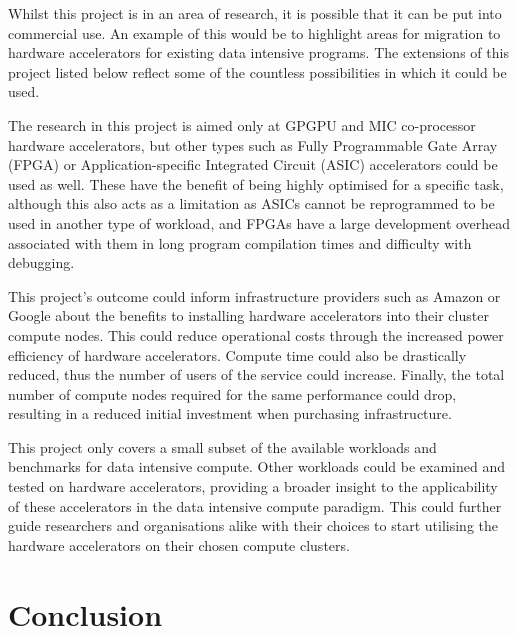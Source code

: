\documentclass[12pt,a4paper]{article}
\begin{document}
            Whilst this project is in an area of research, it is possible that it can be put into commercial use. An example of this would be to highlight areas for migration to hardware accelerators for existing data intensive programs. The extensions of this project listed below reflect some of the countless possibilities in which it could be used.

            \begin{description}[style=nextline]
                \item[\textbf{Additional Accelerator Types}] The research in this project is aimed only at GPGPU and MIC co-processor hardware accelerators, but other types such as Fully Programmable Gate Array (FPGA) or Application-specific Integrated Circuit (ASIC) accelerators could be used as well. These have the benefit of being highly optimised for a specific task, although this also acts as a limitation as ASICs cannot be reprogrammed to be used in another type of workload, and FPGAs have a large development overhead associated with them in long program compilation times and difficulty with debugging.
                \item[\textbf{Infrastructure Design}] This project's outcome could inform infrastructure providers such as Amazon or Google about the benefits to installing hardware accelerators into their cluster compute nodes. This could reduce operational costs through the increased power efficiency of hardware accelerators. Compute time could also be drastically reduced, thus the number of users of the service could increase. Finally, the total number of compute nodes required for the same performance could drop, resulting in a reduced initial investment when purchasing infrastructure.
                \item[\textbf{Additional Workload Testing}] This project only covers a small subset of the available workloads and benchmarks for data intensive compute. Other workloads could be examined and tested on hardware accelerators, providing a broader insight to the applicability of these accelerators in the data intensive compute paradigm. This could further guide researchers and organisations alike with their choices to start utilising the hardware accelerators on their chosen compute clusters.
            \end{description}
        
    \section{Conclusion}
    \label{sec:conclusion}
\end{document}
